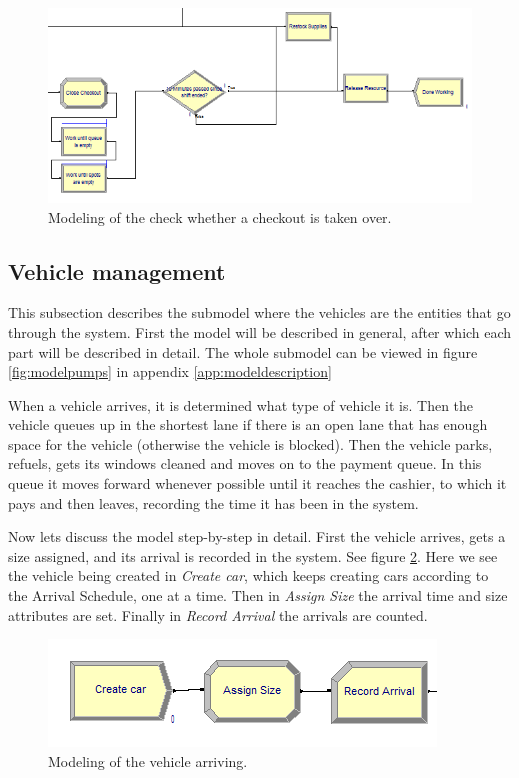 \begin{figure}[]
\begin{center}
	\includegraphics[scale=1]{images/model-description/close-restock-release.PNG}
	\caption{Modeling of the check whether a checkout is taken over.}
	\label{fig:closerestockandrelease}
\end{center}
\end{figure}

\subsection{Vehicle management}
This subsection describes the submodel where the vehicles are the entities that go through the system. First the model will be described in general, after which each part will be described in detail. The whole submodel can be viewed in figure \ref{fig:modelpumps} in appendix \ref{app:modeldescription}

When a vehicle arrives, it is determined what type of vehicle it is. Then the vehicle queues up in the shortest lane if there is an open lane that has enough space for the vehicle (otherwise the vehicle is blocked). Then the vehicle parks, refuels, gets its windows cleaned and moves on to the payment queue. In this queue it moves forward whenever possible until it reaches the cashier, to which it pays and then leaves, recording the time it has been in the system.

Now lets discuss the model step-by-step in detail.
First the vehicle arrives, gets a size assigned, and its arrival is recorded in the system. See figure \ref{fig:vehiclearrives}. Here we see the vehicle being created in \textit{Create car}, which keeps creating cars according to the Arrival Schedule, one at a time. Then in \textit{Assign Size} the arrival time and size attributes are set. Finally in \textit{Record Arrival} the arrivals are counted.

\begin{figure}[]
\begin{center}
	\includegraphics[scale=1]{images/model-description/vehicle-arrives.PNG}
	\caption{Modeling of the vehicle arriving.}
	\label{fig:vehiclearrives}
\end{center}
\end{figure}

